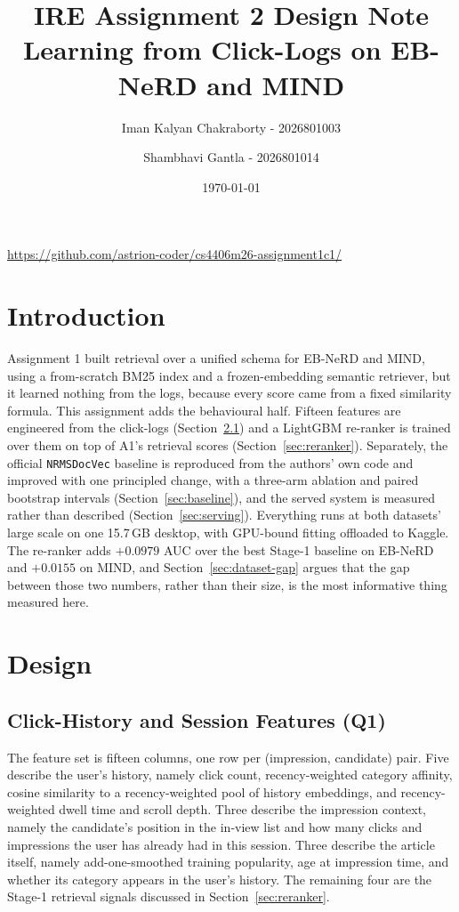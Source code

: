 \documentclass[11pt]{article}
\title{IRE Assignment 2 Design Note\\\large Learning from Click-Logs on EB-NeRD and MIND}
\author{Iman Kalyan Chakraborty - 2026801003 \and Shambhavi Gantla - 2026801014}
\date{\today}
\newcommand{\code}[1]{%
    \colorbox{gray!40}{\texttt{#1}}%
}
\begin{document}
\maketitle
\begin{center}
\url{https://github.com/astrion-coder/cs4406m26-assignment1c1/}
\end{center}

\section{Introduction}
\label{sec:intro}

Assignment 1 built retrieval over a unified schema for EB-NeRD and MIND, using
a from-scratch BM25 index and a frozen-embedding semantic retriever, but it
learned nothing from the logs, because every score came from a fixed
similarity formula. This assignment adds the behavioural half. Fifteen
features are engineered from the click-logs (Section~\ref{sec:features}) and a
LightGBM re-ranker is trained over them on top of A1's retrieval scores
(Section~\ref{sec:reranker}). Separately, the official \code{NRMSDocVec} baseline is
reproduced from the authors' own code and improved with one principled change,
with a three-arm ablation and paired bootstrap intervals
(Section~\ref{sec:baseline}), and the served system is measured rather than
described (Section~\ref{sec:serving}). Everything runs at both datasets' large scale
on one 15.7\,GB desktop, with GPU-bound fitting offloaded to Kaggle. The
re-ranker adds $+0.0979$ AUC over the best Stage-1 baseline on EB-NeRD and
$+0.0155$ on MIND, and Section~\ref{sec:dataset-gap} argues that the gap between
those two numbers, rather than their size, is the most informative thing
measured here.

\section{Design}
\label{sec:design}

\subsection{Click-History and Session Features (Q1)}
\label{sec:features}

The feature set is fifteen columns, one row per (impression, candidate) pair.
Five describe the user's history, namely click count, recency-weighted
category affinity, cosine similarity to a recency-weighted pool of history
embeddings, and recency-weighted dwell time and scroll depth. Three describe
the impression context, namely the candidate's position in the in-view list
and how many clicks and impressions the user has already had in this session.
Three describe the article itself, namely add-one-smoothed training
popularity, age at impression time, and whether its category appears in the
user's history. The remaining four are the Stage-1 retrieval signals discussed
in Section~\ref{sec:reranker}.
\end{document}
